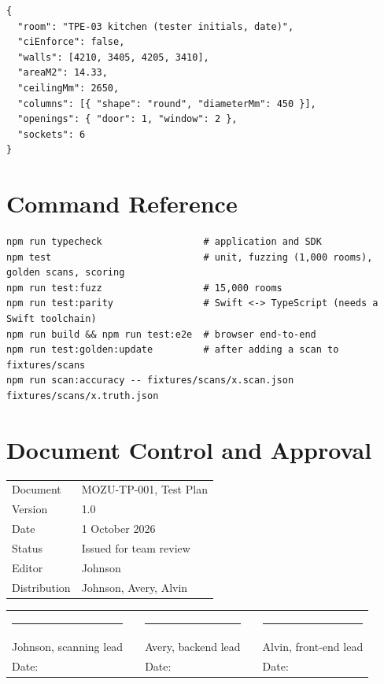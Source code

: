 \documentclass[conference,a4paper,10pt]{IEEEtran}
\begin{document}
\begin{lstlisting}
{
  "room": "TPE-03 kitchen (tester initials, date)",
  "ciEnforce": false,
  "walls": [4210, 3405, 4205, 3410],
  "areaM2": 14.33,
  "ceilingMm": 2650,
  "columns": [{ "shape": "round", "diameterMm": 450 }],
  "openings": { "door": 1, "window": 2 },
  "sockets": 6
}
\end{lstlisting}

\section{Command Reference}\label{app:commands}

\begin{lstlisting}
npm run typecheck                  # application and SDK
npm test                           # unit, fuzzing (1,000 rooms), golden scans, scoring
npm run test:fuzz                  # 15,000 rooms
npm run test:parity                # Swift <-> TypeScript (needs a Swift toolchain)
npm run build && npm run test:e2e  # browser end-to-end
npm run test:golden:update         # after adding a scan to fixtures/scans
npm run scan:accuracy -- fixtures/scans/x.scan.json fixtures/scans/x.truth.json
\end{lstlisting}

\section{Document Control and Approval}\label{app:approval}

\begin{center}
\begin{tabular}{@{}ll@{}}
\toprule
Document & MOZU-TP-001, Test Plan \\
Version & 1.0 \\
Date & 1 October 2026 \\
Status & Issued for team review \\
Editor & Johnson \\
Distribution & Johnson, Avery, Alvin \\
\bottomrule
\end{tabular}

\vspace{14mm}

\begin{tabular}{@{}p{4.6cm}p{0.6cm}p{4.6cm}p{0.6cm}p{4.6cm}@{}}
\rule{4.6cm}{0.4pt} & & \rule{4.6cm}{0.4pt} & & \rule{4.6cm}{0.4pt} \\
Johnson, scanning lead & & Avery, backend lead & & Alvin, front-end lead \\[2pt]
Date: & & Date: & & Date: \\
\end{tabular}
\end{center}
\end{document}
